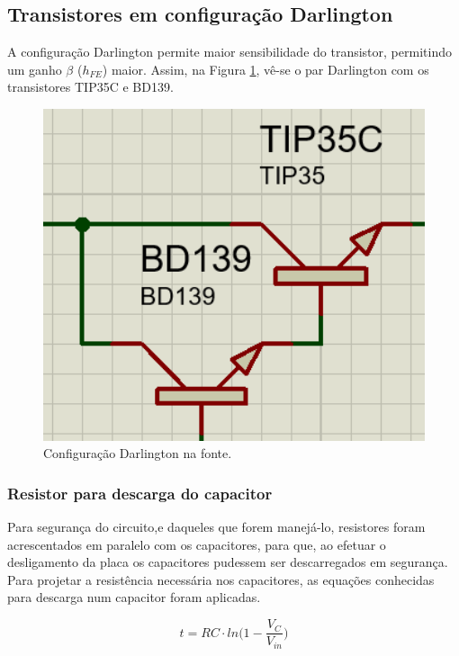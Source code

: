 \documentclass[a4paper,12pt,oneside,openany,table,xcdraw]{article}
\begin{document}
\subsection{Transistores em configuração Darlington}
A configuração Darlington permite maior sensibilidade do transistor, permitindo um ganho $\beta$ ($h_{FE}$) maior. Assim, na Figura \ref{fonte:darlington}, vê-se o par Darlington com os transistores TIP35C e BD139.

\begin{figure}[H]
\centering
\captionsetup{font=scriptsize}
\includegraphics[width=15cm]{fonte-darlington}
\caption{Configuração Darlington na fonte.}
\label{fonte:darlington}
\end{figure}

\subsubsection{Resistor para descarga do capacitor} \label{descarga}
Para segurança do circuito,e daqueles que forem manejá-lo, resistores foram acrescentados em paralelo com os capacitores, para que, ao efetuar o desligamento da placa os capacitores pudessem ser descarregados em segurança.
Para projetar a resistência necessária nos capacitores, as equações conhecidas para descarga num capacitor foram aplicadas.

\begin{equation}
t= RC \cdot ln\bigg( 1 - \frac{V_{C}}{V_{in}} \bigg) 
\end{equation}
\end{document}
